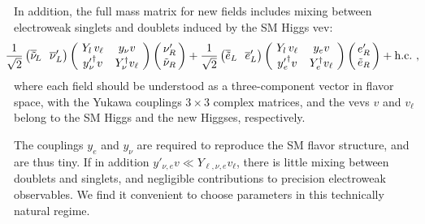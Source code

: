 \documentclass[prd,showpcs,amsmath,amssymb,nofootinbib,preprintnumbers,balancelastpage,longbibliography,superscriptaddress,notitlepage]{revtex4}
\def\bea{\begin{eqnarray}}
\def\eea{\end{eqnarray}}
\def\bea{\begin{eqnarray}}
\def\eea{\end{eqnarray}}
\begin{document}
In addition, the full mass matrix for new fields includes mixing between electroweak singlets and doublets induced by the SM Higgs vev:
\bea
& & \hspace*{-0.75cm}
\frac{1}{\sqrt{2}}
\left(
\overline{\tilde{\nu}}_{\!L} ~~ \overline{\nu}^\prime_L
\right)
%
 \left(\!
  \begin{array}{cc}
    Y_l \,v_\ell & y_\nu v \\
    {y'}_{\!\!\nu}^\dagger v & Y_\nu^\dagger  v_\ell \\
  \end{array}\!
\right)
%
\left(\!\!
  \begin{array}{c}
   \nu^\prime_R \\
    \tilde{\nu}_R \\
  \end{array}\!\!
\right)+ \frac{1}{\sqrt{2}}
\left(
\overline{\tilde{e}}_L ~~ \overline{e}^\prime_L
\right)
%
 \left(\!
  \begin{array}{cc}
    Y_l \,v_\ell & y_e v \\
    {y'}_{\!\!e}^\dagger v &Y_e^\dagger  v_\ell \\
  \end{array}\!
\right)
%
\left(\!\!
  \begin{array}{c}
   e^\prime_R \\
    \tilde{e}_R \\
  \end{array}\!\!
\right)
+ {\rm h.c.} \ ,
\eea 
where each field should be understood as a three-component vector in flavor space, with the Yukawa couplings $3 \times 3$ complex matrices, and the vevs $v$ and $v_\ell$ belong to the SM Higgs and the new Higgses, respectively.  

The couplings
$y_e$ and $y_\nu$ are required to reproduce the SM flavor structure, and are thus tiny.  If in addition $y'_{\nu,e} v \ll Y_{\ell, \nu, e} v_\ell$, there is little mixing
between doublets and singlets, and negligible contributions to precision electroweak observables.  We 
find it convenient to choose parameters in this technically natural regime.
\end{document}
